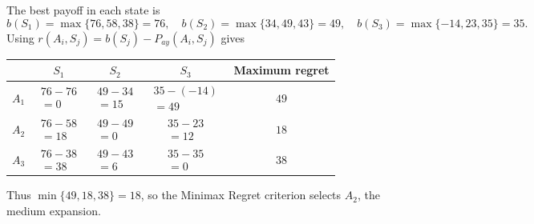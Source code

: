 {		The best payoff in each state is
		\[
		b(S_1)=\max\{76,58,38\}=76,\quad
		b(S_2)=\max\{34,49,43\}=49,\quad
		b(S_3)=\max\{-14,23,35\}=35.
		\]
		Using $r(A_i,S_j)=b(S_j)-P_{ay}(A_i,S_j)$ gives
		\begin{center}\renewcommand{\arraystretch}{1.25}\begin{tabular}{lcccc}\toprule
				& $S_1$ & $S_2$ & $S_3$ & Maximum regret\\ \midrule
				$A_1$&$\begin{gathered}76-76\\=0\end{gathered}$&$\begin{gathered}49-34\\=15\end{gathered}$&$\begin{gathered}35-(-14)\\=49\end{gathered}$&$49$\\
				$A_2$&$\begin{gathered}76-58\\=18\end{gathered}$&$\begin{gathered}49-49\\=0\end{gathered}$&$\begin{gathered}35-23\\=12\end{gathered}$&$18$\\
				$A_3$&$\begin{gathered}76-38\\=38\end{gathered}$&$\begin{gathered}49-43\\=6\end{gathered}$&$\begin{gathered}35-35\\=0\end{gathered}$&$38$\\ \bottomrule\end{tabular}\end{center}
		Thus $\min\{49,18,38\}=18$, so the Minimax Regret criterion selects $\boxed{A_2}$, the medium expansion.

	}


